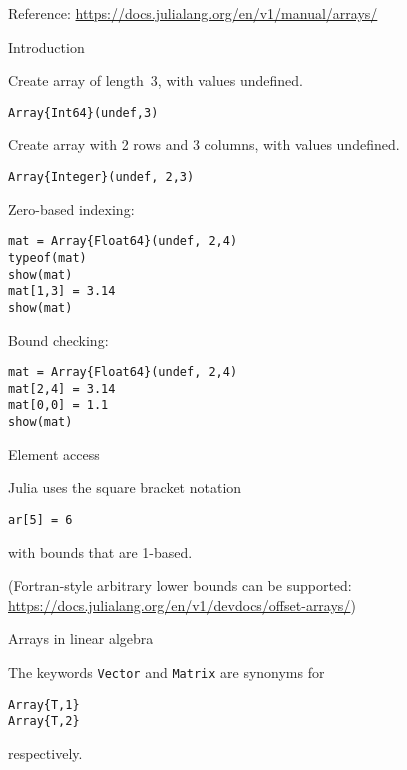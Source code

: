 
Reference: \url{https://docs.julialang.org/en/v1/manual/arrays/}

 {Introduction}

Create array of length~3, with values undefined.
\begin{lstlisting}
Array{Int64}(undef,3)
\end{lstlisting}

Create array with 2 rows and 3 columns, with values undefined.
\begin{lstlisting}
Array{Integer}(undef, 2,3)
\end{lstlisting}

Zero-based indexing:
\begin{lstlisting}
mat = Array{Float64}(undef, 2,4)
typeof(mat)
show(mat)
mat[1,3] = 3.14
show(mat)
\end{lstlisting}

Bound checking:
\begin{lstlisting}
mat = Array{Float64}(undef, 2,4)
mat[2,4] = 3.14
mat[0,0] = 1.1
show(mat)
\end{lstlisting}

 {Element access}

Julia uses the square bracket notation
\begin{lstlisting}
ar[5] = 6
\end{lstlisting}
with bounds that are 1-based.

(Fortran-style arbitrary lower bounds can be supported:
\url{https://docs.julialang.org/en/v1/devdocs/offset-arrays/})

 {Arrays in linear algebra}

The keywords \lstinline{Vector} and \lstinline{Matrix}
are synonyms for
\begin{lstlisting}
Array{T,1}
Array{T,2}
\end{lstlisting}
respectively.

